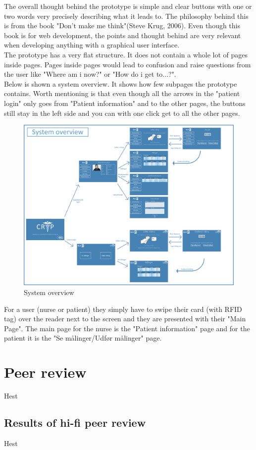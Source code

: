 The overall thought behind the prototype is simple and clear buttons with one or two words very precisely describing what it leads to. The philosophy behind this is from the book "Don't make me think"(Steve Krug, 2006). Even though this book is for web development, the points and thought behind are very relevant when developing anything with a graphical user interface.\\
The prototype has a very flat structure. It does not contain a whole lot of pages inside pages. Pages inside pages would lead to confusion and raise questions from the user like "Where am i now?" or "How do i get to...?".\\
Below is shown a system overview. It shows how few subpages the prototype contains. Worth mentioning is that even though all the arrows in the "patient login" only goes from "Patient information" and to the other pages, the buttons still stay in the left side and you can with one click get to all the other pages.\\
\begin{figure}[H]
\centering
\includegraphics[width=1\textwidth]{billeder/system_hifi.png}
\caption{System overview}
\end{figure}
For a user (nurse or patient) they simply have to swipe their card (with RFID tag) over the reader next to the screen and they are presented with their "Main Page". The main page for the nurse is the "Patient information" page and for the patient it is the "Se målinger/Udfør målinger" page.\\


\section{Peer review}
Hest

\subsection{Results of hi-fi peer review}
Hest